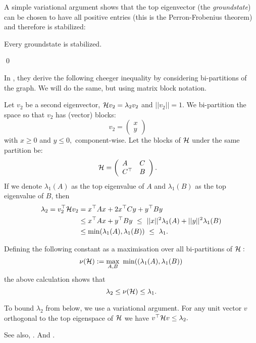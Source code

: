 \documentclass[12pt,notitlepage,longbibliography,nofootinbib,tightenlines]{revtex4}
\begin{document}
A simple variational argument
shows that the top eigenvector (the {\it groundstate})
can be chosen to have all positive entries
(this is the Perron-Frobenius theorem)
and therefore is stabilized:

Every groundstate is stabilized.

\qed


In \cite{Friedland2002}, they derive the following cheeger inequality
by considering bi-partitions of the graph. We will do the
same, but using matrix block notation.

Let $v_2$ be a second eigenvector, $ \mathcal{H} v_2 = \lambda_2 v_2 $ 
and $||v_2||=1$.
We bi-partition the space 
so that $v_2$ has (vector) blocks:
$$
v_2 = \left( \begin{array}{l}
x\\
y\end{array} \right)\quad
$$
with $x\ge 0$ and $y\le 0,$ component-wise.
Let the blocks of $\mathcal{H}$ under the same partition be:
$$
\mathcal{H} = \left( \begin{array}{ll}
A&C\\
C^\top&B\end{array} \right).\quad
$$
If we denote $\lambda_1(A)$ as the top eigenvalue of $A$ and
$\lambda_1(B)$ as the top eigenvalue of $B$,
then
\begin{align*}
\lambda_2 = v_2^\top \mathcal{H} v_2 &= x^\top A x + 2 x^\top C y + y^\top B y \\
        &\le x^\top A x + y^\top B y\ \le\ ||x||^2 \lambda_1(A) + ||y||^2 \lambda_1(B) \\
        &\le \mbox{min}(\lambda_1(A), \lambda_1(B))\ \le\ \lambda_1.
\end{align*}

Defining the following constant as a maximisation over
all bi-partitions of $\mathcal{H}:$
$$
    \nu(\Ham) := \max_{A, B}\ \mbox{min}((\lambda_1(A), \lambda_1(B))
$$
the above calculation shows that
$$
    \lambda_2 \le \nu(\mathcal{H}) \le \lambda_1.
$$

To bound $\lambda_2$ from below, we use a variational argument.
For any unit vector $v$ orthogonal to the top eigenspace of $\mathcal{H}$ we
have $v^\top \mathcal{H} v \le \lambda_2.$


See also,
\cite{AlShimary2010}.
And \cite{Jarret2015}.

%
\end{document}
